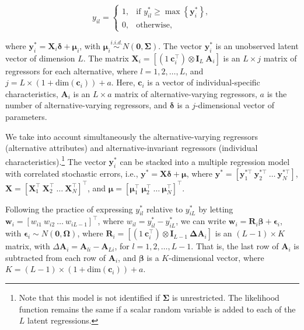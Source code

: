 \begin{equation*}
	y_{il} =
	\begin{cases}
		1, & \text{if } y_{il}^* \geq \max\left\{\bm{y}_i^*\right\}, \\
		0, & \text{otherwise,}
	\end{cases}
\end{equation*}

where $\bm{y}_i^* = \bm{X}_{i} \bm{\delta} + \bm{\mu}_i$, with $\bm{\mu}_i \stackrel{i.i.d.}{\sim} N(\bm{0}, \bm{\Sigma})$. The vector $\bm{y}_i^*$ is an unobserved latent vector of dimension $L$. The matrix $\bm{X}_i = \left[(1 \ \bm{c}_i^{\top}) \otimes \bm{I}_L \ \bm{A}_i\right]$ is an $L \times j$ matrix of regressors for each alternative, where $l = 1, 2, \dots, L$, and $j = L \times (1 + \text{dim}(\bm{c}_i)) + a$. Here, $\bm{c}_i$ is a vector of individual-specific characteristics, $\bm{A}_i$ is an $L \times a$ matrix of alternative-varying regressors, $a$ is the number of alternative-varying regressors, and $\bm{\delta}$ is a $j$-dimensional vector of parameters.

We take into account simultaneously the alternative-varying regressors (alternative attributes) and alternative-invariant regressors (individual characteristics).\footnote{Note that this model is not identified if $\bm{\Sigma}$ is unrestricted. The likelihood function remains the same if a scalar random variable is added to each of the $L$ latent regressions.} The vector $\bm{y}_i^*$ can be stacked into a multiple regression model with correlated stochastic errors, i.e., $\bm{y}^* = \bm{X} \bm{\delta} + \bm{\mu}$, where $\bm{y}^* = \left[\bm{y}_1^{*\top} \ \bm{y}_2^{*\top} \ \dots \ \bm{y}_N^{*\top}\right]$, $\bm{X} = \left[\bm{X}_1^{\top} \ \bm{X}_2^{\top} \ \dots \ \bm{X}_N^{\top}\right]^{\top}$, and $\bm{\mu} = \left[\bm{\mu}_1^{\top} \ \bm{\mu}_2^{\top} \ \dots \ \bm{\mu}_N^{\top}\right]^{\top}$.

Following the practice of expressing $y_{il}^*$ relative to $y_{iL}^*$ by letting $\bm{w}_i = \left[w_{i1} \ w_{i2} \ \dots \ w_{iL-1}\right]^{\top}$, where $w_{il} = y_{il}^* - y_{iL}^*$, we can write $\bm{w}_i = \bm{R}_i \bm{\beta} + \bm{\epsilon}_i$, with $\bm{\epsilon}_i \sim N(\bm{0}, \bm{\Omega})$, where $\bm{R}_i = \left[(1 \ \bm{c}_i^{\top}) \otimes \bm{I}_{L-1} \ \bm{\Delta A}_i\right]$ is an $(L-1) \times K$ matrix, with $\Delta \bm{A}_i = \bm{A}_{li} - \bm{A}_{Li}$, for $l = 1, 2, \dots, L-1$. That is, the last row of $\bm{A}_i$ is subtracted from each row of $\bm{A}_i$, and $\bm{\beta}$ is a $K$-dimensional vector, where $K = (L-1) \times (1 + \text{dim}(\bm{c}_i)) + a$.

